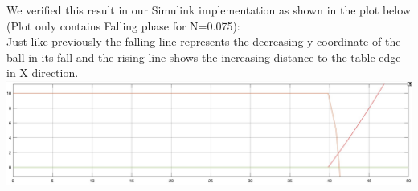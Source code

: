 \documentclass[12pt]{article}
\begin{document}
\begin{enumerate}[a)]
    We verified this result in our Simulink implementation as shown in the plot below (Plot only contains Falling phase for N=0.075):\\
    Just like previously the falling line represents the decreasing y coordinate of the ball in its fall and the rising line shows the increasing distance to the table edge in X direction.
    \includegraphics[scale = 0.20]{pictures/falling_0075}\\
\end{enumerate}
\end{document}

